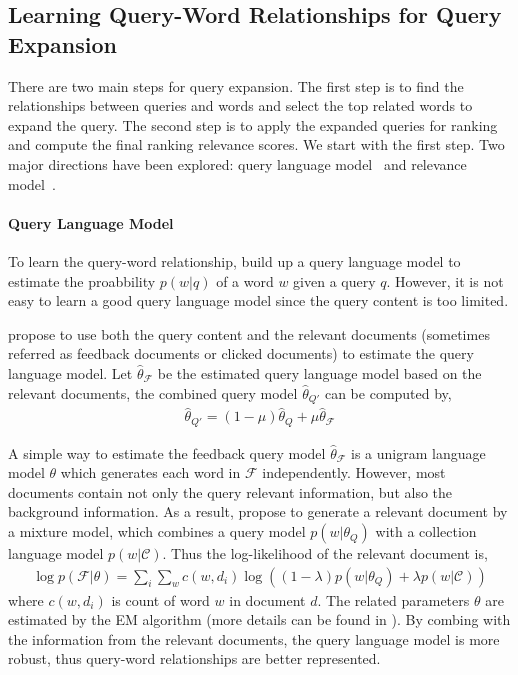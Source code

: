 \subsection{Learning Query-Word Relationships for Query Expansion}

There are two main steps for query expansion. The first step is to
find the relationships between queries and words and select the top
related words to expand the query. The second step is to apply the
expanded queries for ranking and compute the final ranking relevance
scores. We start with the first step. Two major directions have been
explored: query language model~\citep{zhai-01b} and relevance
model~\citep{Lavrenko-2001}.

\paragraph{Query Language Model}

To learn the query-word relationship, \cite{zhai-01b} build up a query
language model to estimate the proabbility $p(w|q)$ of a word $w$
given a query $q$. However, it is not easy to learn a good query
language model since the query content is too limited.

\cite{zhai-01b} propose to use both the query content and the relevant
documents (sometimes referred as feedback documents or clicked
documents) to estimate the query language model. Let
$\hat{\theta}_{\mathcal{F}}$ be the estimated query language model
based on the relevant documents, the combined query model
$\hat{\theta}_{Q'}$ can be computed by,
\begin{align}
\label{eq:qlm-comb}
\hat{\theta}_{Q'} = (1 - \mu)\hat{\theta}_{Q} + \mu \hat{\theta}_{\mathcal{F}}
\end{align}

A simple way to estimate the feedback query model
$\hat{\theta}_{\mathcal{F}}$ is a unigram language model $\theta$
which generates each word in $\mathcal{F}$ independently. However,
most documents contain not only the query relevant information, but
also the background information. As a result, \cite{zhai-01b} propose
to generate a relevant document by a mixture model, which combines a
query model $p(w|\theta_Q)$ with a collection language model
$p(w|\mathcal{C})$. Thus the log-likelihood of the relevant document
is,
\begin{align}
\log p(\mathcal{F}|\theta) = \sum_i \sum_w c(w, d_i) \log((1-\lambda)p(w|\theta_Q) + \lambda p(w|\mathcal{C}))
\end{align}
where $c(w, d_i)$ is count of word $w$ in document $d$. The related parameters $\theta$ are estimated by the EM algorithm (more details can be found in \cite{zhai-01b}). By combing with the information from the relevant documents, the query language model is more robust, thus query-word relationships are better represented.

